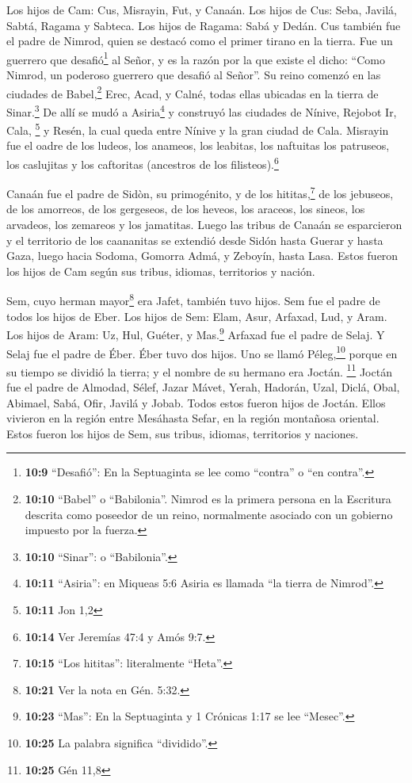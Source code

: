  Los hijos de Cam: Cus, Misrayin, Fut, y Canaán.
 Los hijos de Cus: Seba, Javilá, Sabtá, Ragama y Sabteca.
Los hijos de Ragama: Sabá y Dedán.  Cus también fue el
padre de Nimrod, quien se destacó como el primer tirano en la tierra.
 Fue un guerrero que desafió\footnote{\textbf{10:9}
  ``Desafió'': En la Septuaginta se lee como ``contra'' o ``en contra''.}
al Señor, y es la razón por la que existe el dicho: ``Como Nimrod, un
poderoso guerrero que desafió al Señor''.  Su reino
comenzó en las ciudades de Babel,\footnote{\textbf{10:10} ``Babel'' o
  ``Babilonia''. Nimrod es la primera persona en la Escritura descrita
  como poseedor de un reino, normalmente asociado con un gobierno
  impuesto por la fuerza.} Erec, Acad, y Calné, todas ellas ubicadas en
la tierra de Sinar.\footnote{\textbf{10:10} ``Sinar'': o ``Babilonia''.}
 De allí se mudó a Asiria\footnote{\textbf{10:11}
  ``Asiria'': en Miqueas 5:6 Asiria es llamada ``la tierra de Nimrod''.}
y construyó las ciudades de Nínive, Rejobot Ir, Cala, \footnote{\textbf{10:11}
  Jon 1,2}  y Resén, la cual queda entre Nínive y la gran
ciudad de Cala.  Misrayin fue el oadre de los ludeos, los
anameos, los leabitas, los naftuitas  los patruseos, los
caslujitas y los caftoritas (ancestros de los filisteos).\footnote{\textbf{10:14}
  Ver Jeremías 47:4 y Amós 9:7.}

 Canaán fue el padre de Sidòn, su primogénito, y de los
hititas,\footnote{\textbf{10:15} ``Los hititas'': literalmente ``Heta''.}
 de los jebuseos, de los amorreos, de los gergeseos,
 de los heveos, los araceos, los sineos, 
los arvadeos, los zemareos y los jamatitas. Luego las tribus de Canaán
se esparcieron  y el territorio de los caananitas se
extendió desde Sidón hasta Guerar y hasta Gaza, luego hacia Sodoma,
Gomorra Admá, y Zeboyín, hasta Lasa.  Estos fueron los
hijos de Cam según sus tribus, idiomas, territorios y nación.

 Sem, cuyo herman mayor\footnote{\textbf{10:21} Ver la
  nota en Gén. 5:32.} era Jafet, también tuvo hijos. Sem fue el padre de
todos los hijos de Eber.  Los hijos de Sem: Elam, Asur,
Arfaxad, Lud, y Aram.  Los hijos de Aram: Uz, Hul,
Guéter, y Mas.\footnote{\textbf{10:23} ``Mas'': En la Septuaginta y 1
  Crónicas 1:17 se lee ``Mesec''.}  Arfaxad fue el padre
de Selaj. Y Selaj fue el padre de Éber.  Éber tuvo dos
hijos. Uno se llamó Péleg,\footnote{\textbf{10:25} La palabra significa
  ``dividido''.} porque en su tiempo se dividió la tierra; y el nombre
de su hermano era Joctán. \footnote{\textbf{10:25} Gén 11,8}
 Joctán fue el padre de Almodad, Sélef, Jazar Mávet,
Yerah,  Hadorán, Uzal, Diclá,  Obal,
Abimael, Sabá,  Ofir, Javilá y Jobab. Todos estos fueron
hijos de Joctán.  Ellos vivieron en la región entre
Mesáhasta Sefar, en la región montañosa oriental.  Estos
fueron los hijos de Sem, sus tribus, idiomas, territorios y naciones.

